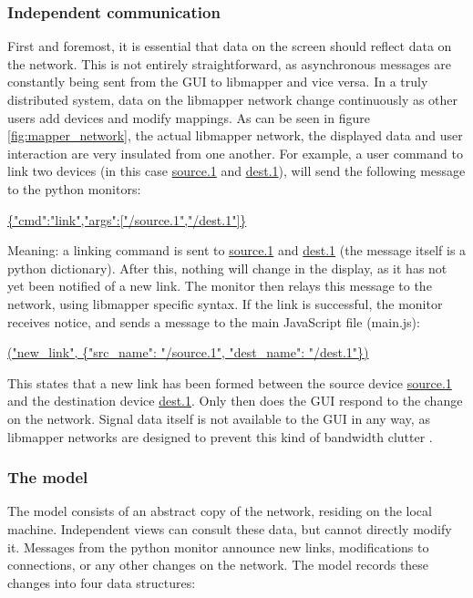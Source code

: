 		\subsubsection{Independent communication}

First and foremost, it is essential that data on the screen should reflect data on the network. This is not entirely straightforward, as asynchronous messages are constantly being sent from the GUI to libmapper and vice versa. In a truly distributed system, data on the libmapper network change continuously as other users add devices and modify mappings. As can be seen in figure \ref{fig:mapper_network}, the actual libmapper network, the displayed data and user interaction are very insulated from one another. For example, a user command to link two devices (in this case \url{source.1} and \url{dest.1}), will send the following message to the python monitors:

\url{ {"cmd":"link","args":["/source.1","/dest.1"]} }

Meaning: a linking command is sent to \url{source.1} and \url{dest.1} (the message itself is a python dictionary). After this, nothing will change in the display, as it has not yet been notified of a new link. The monitor then relays this message to the network, using libmapper specific syntax. If the link is successful, the monitor receives notice, and sends a message to the main JavaScript file (main.js):

\url{("new_link", {"src_name": "/source.1", "dest_name": "/dest.1"}) }

This states that a new link has been formed between the source device \url{source.1} and the destination device \url{dest.1}. Only then does the GUI respond to the change on the network. Signal data itself is not available to the GUI in any way, as libmapper networks are designed to prevent this kind of bandwidth clutter .

		\subsubsection{The model}

The model consists of an abstract copy of the network, residing on the local machine. Independent views can consult these data, but cannot directly modify it. Messages from the python monitor announce new links, modifications to connections, or any other changes on the network. The model records these changes into four data structures:

